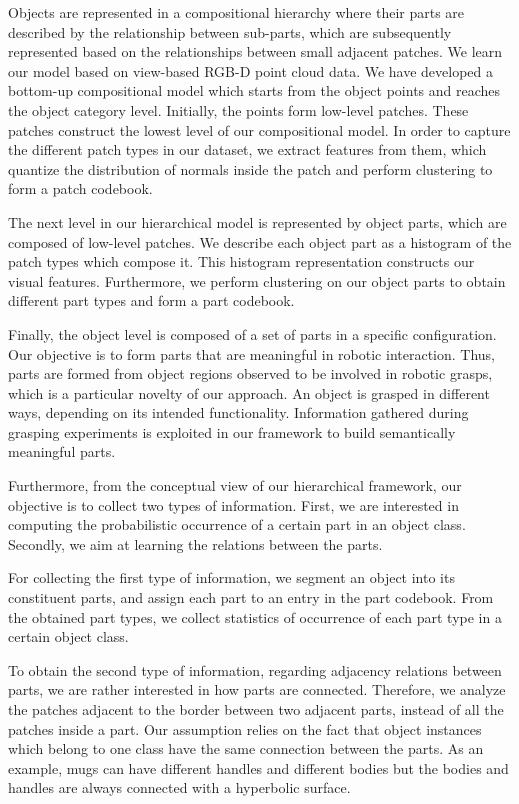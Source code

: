 \documentclass[a4paper,11pt,pdf]{pacmanreport}
\begin{document}
Objects are represented in a compositional hierarchy where their parts are described by the relationship between sub-parts, which are subsequently represented based on the relationships between small adjacent patches. We learn our model based on view-based RGB-D point cloud data. We have developed a bottom-up compositional model which starts from the object points and reaches the object category level. Initially, the points form low-level patches. These patches construct the lowest level of our compositional model. In order to capture the different patch types in our dataset, we extract features from them, which quantize the distribution of normals inside the patch and perform clustering to form a patch codebook.

The next level in our hierarchical model is represented by object parts, which are composed of low-level patches. We describe each object part as a histogram of the patch types which compose it. This histogram representation constructs our visual features. Furthermore, we perform clustering on our object parts to obtain different part types and form a part codebook. 

Finally, the object level is composed of a set of parts in a specific configuration. Our objective is to form parts that are meaningful in robotic interaction.  Thus, parts are formed from object regions observed to be involved in robotic grasps, which is a particular novelty of our approach. An object is grasped in different ways, depending on its intended functionality.  Information gathered during grasping experiments is exploited in our framework to build semantically meaningful parts.

Furthermore, from the conceptual view of our hierarchical framework, our objective is to collect two types of information. First, we are interested in computing the probabilistic occurrence of a certain part in an object class. Secondly, we aim at learning the relations between the parts.

For collecting the first type of information, we segment an object
into its constituent parts, and assign each part to an entry in the
part codebook. From the obtained part types, we collect statistics of
occurrence of each part type in a certain object class.

To obtain the second type of information, regarding adjacency relations between parts, we are rather interested in how parts are connected. Therefore, we analyze the patches adjacent to the border between two adjacent parts, instead of all the patches inside a part. Our assumption relies on the fact that object instances which belong to one class have the same connection between the parts. As an example, mugs can have different handles and different bodies but the bodies and handles are always connected with a hyperbolic surface.
\end{document}
